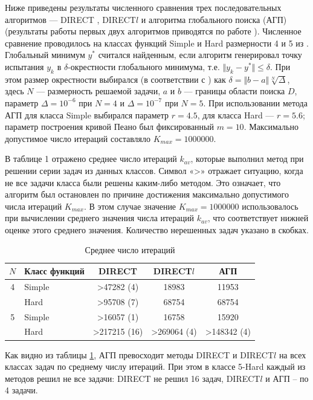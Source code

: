 Ниже приведены результаты численного сравнения трех последовательных алгоритмов --- DIRECT \cite{zilinsk}, DIRECT\(l\)  \cite{sergKvaDiaPaper} и алгоритма глобального поиска (АГП) (результаты работы первых двух алгоритмов приводятся по работе \cite{jonesLipOpt}). Численное сравнение проводилось на классах функций Simple и Hard размерности 4 и 5 из \cite{jonesLipOpt}. Глобальный минимум \(y^*\) считался найденным, если алгоритм генерировал точку испытания \(y_k\) в \(\delta\)-окрестности глобального минимума, т.е. \(\Vert y_k-y^*\Vert\leqslant\delta\). При этом размер окрестности выбирался (в соответствии с \cite{jonesLipOpt}) как \(\delta=\Vert b-a\Vert \sqrt[N]{\Delta}\), здесь \(N\) --- размерность решаемой задачи, \(a\) и \(b\) --- границы области поиска \(D\), параметр \(\Delta=10^{-6}\) при \(N=4\) и \(\Delta=10^{-7}\) при \(N=5\). При использовании метода АГП для класса Simple выбирался параметр \(r=4.5\), для класса Hard --- \(r=5.6\); параметр построения кривой Пеано был фиксированный \(m=10\). Максимально допустимое число итераций составляло \(K_{max} = 1 000 000\).
\par
В таблице 1 отражено среднее число итераций \(k_{av}\), которые выполнил метод при решении серии задач из данных классов. Символ «>» отражает ситуацию, когда не все задачи класса были решены каким-либо методом. Это означает, что алгоритм был остановлен по причине достижения максимально допустимого числа итераций \(K_{max}\). В этом случае значение \(K_{max}=1 000 000\) использовалось при вычислении среднего значения числа итераций \(k_{av}\), что соответствует нижней оценке этого среднего значения. Количество нерешенных задач указано в скобках.
\begin{table}
    \centering
    \begin{tabular}{|c|p{3cm}|c|c|c|}
    \hline
    \(N\) & Класс функций & DIRECT & DIRECT\(l\) & АГП \\ \hline
    4 & Simple & >47282 (4) & 18983 & 11953\\ \cline{2-5}
      & Hard & >95708 (7) & 68754 & 68754\\ \hline
    5 & Simple & >16057 (1) & 16758 & 15920\\ \cline{2-5}
      & Hard & >217215 (16) & >269064 (4) & >148342 (4)\\ \hline
    \end{tabular}
    \caption{Среднее число итераций}
    \label{table:average_iters}
\end{table}
\par
Как видно из таблицы \ref{table:average_iters}, АГП превосходит методы DIRECT и DIRECT\(l\) на всех классах задач по среднему числу итераций. При этом в классе 5-Hard каждый из методов решил не все задачи: DIRECT не решил 16 задач, DIRECT\(l\) и АГП – по 4 задачи.
